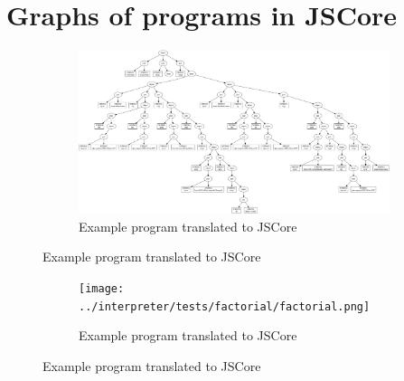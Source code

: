 \section{Graphs of programs in JSCore}
\label{graphs}

\begin{figure}
\begin{figure}[H]
\includegraphics[width=\textwidth]{../interpreter/tests/helloworld/helloworld.png}
\caption{Example program translated to JSCore}
\label{helloworldgraph}
\end{figure}
\end{figure}

\begin{figure}
\begin{figure}[H]
\texttt{[image: ../interpreter/tests/factorial/factorial.png]}
\caption{Example program translated to JSCore}
\label{helloworldgraph}
\end{figure}
\end{figure}


